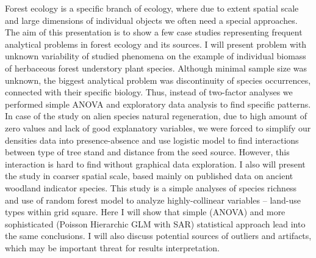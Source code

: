 \documentclass[\main/boa.tex]{subfiles}
\begin{document}
Forest ecology is a specific branch of ecology, where due to extent
spatial scale and large dimensions of individual objects we often need a
special approaches. The aim of this presentation is to show a few case
studies representing frequent analytical problems in forest ecology and
its sources. I will present problem with unknown variability of studied
phenomena on the example of individual biomass of herbaceous forest
understory plant species. Although minimal sample size was unknown, the
biggest analytical problem was discontinuity of species occurrences,
connected with their specific biology. Thus, instead of two-factor
analyses we performed simple ANOVA and exploratory data analysis to find
specific patterns. In case of the study on alien species natural
regeneration, due to high amount of zero values and lack of good
explanatory variables, we were forced to simplify our densities data
into presence-absence and use logistic model to find interactions
between type of tree stand and distance from the seed source. However,
this interaction is hard to find without graphical data exploration. I
also will present the study in coarser spatial scale, based mainly on
published data on ancient woodland indicator species. This study is a
simple analyses of species richness and use of random forest model to
analyze highly-collinear variables -- land-use types within grid square.
Here I will show that simple (ANOVA) and more sophisticated (Poisson
Hierarchic GLM with SAR) statistical approach lead into the same
conclusions. I will also discuss potential sources of outliers and
artifacts, which may be important threat for results interpretation.
\end{document}

